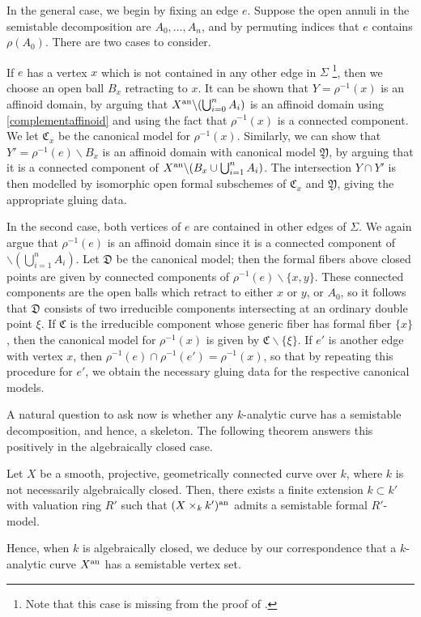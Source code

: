 In the general case, we begin by fixing an edge $e$.
Suppose the open annuli in the semistable decomposition are $A_0, \dots, A_n$, and by permuting indices that $e$ contains $\rho(A_0)$.
There are two cases to consider. 

If $e$ has a vertex $x$ which is not contained in any other edge in $\Sigma$ \footnote{Note that this case is missing from the proof of  \parencite[Theorem 3.2.10]{bpr}.}, then we choose an open ball $B_x$ retracting to $x$.
It can be shown that $Y = \rho^{-1}(x)$ is an affinoid domain, by arguing that $X^{\text{an}} \backslash (\bigcup_{i = 0}^{n} A_i)$ is an affinoid domain using \cref{complementaffinoid} and using the fact that $\rho^{-1}(x)$ is a connected component.
We let $\mathfrak{C}_x$ be the canonical model for $\rho^{-1}(x)$.
Similarly, we can show that $Y' = \rho^{-1}(e) \backslash B_x$ is an affinoid domain with canonical model $\mathfrak{Y}$, by arguing that it is a connected component of $X^{\text{an}} \backslash (B_x \cup \bigcup_{i = 1}^{n} A_i)$.
The intersection $Y \cap Y'$ is then modelled by isomorphic open formal subschemes of $\mathfrak{C}_x$ and $\mathfrak{Y}$, giving the appropriate gluing data.

In the second case, both vertices of $e$ are contained in other edges of $\Sigma$.
We again argue that $\rho^{-1}(e)$ is an affinoid domain since it is a connected component of $\backslash (\bigcup_{i = 1}^{n} A_i)$.
Let $\mathfrak{D}$ be the canonical model; then the formal fibers above closed points are given by connected components of $\rho^{-1}(e) \backslash \{x, y \}$.
These connected components are the open balls which retract to either $x$ or $y$, or $A_0$, so it follows that $\mathfrak{D}$ consists of two irreducible components intersecting at an ordinary double point $\xi$.
If $\mathfrak{C}$ is the irreducible component whose generic fiber has formal fiber $\{x\}$, then the canonical model for $\rho^{-1}(x)$ is given by $\mathfrak{C} \backslash \{\xi\}$.
If $e'$ is another edge with vertex $x$, then $\rho^{-1}(e) \cap \rho^{-1}(e') = \rho^{-1}(x)$, so that by repeating this procedure for $e'$, we obtain the necessary gluing data for the respective canonical models.

A natural question to ask now is whether any $k$-analytic curve has a semistable decomposition, and hence, a skeleton. 
The following theorem answers this positively in the algebraically closed case.

\begin{theorem} \parencite[Theorem 7.1]{boschlutkebohmert}
    Let $X$ be a smooth, projective, geometrically connected curve over $k$, where $k$ is not necessarily algebraically closed.
    Then, there exists a finite extension $k \subset k'$ with valuation ring $R'$ such that $(X \times_{k} k')^{\text{an}}$ admits a semistable formal $R'$-model.
\end{theorem}

Hence, when $k$ is algebraically closed, we deduce by our correspondence that a $k$-analytic curve $X^{\text{an}}$ has a semistable vertex set.
